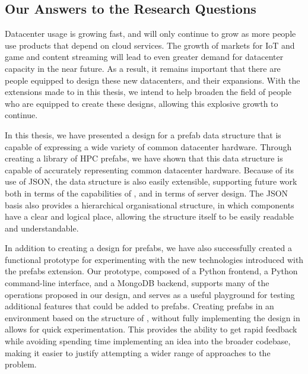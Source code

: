 \documentclass[11pt]{article}
\begin{document}
	\subsection{Our Answers to the Research Questions}
		Datacenter usage is growing fast, and will only continue to grow as more people use products that depend on cloud services.
		The growth of markets for IoT and game and content streaming will lead to even greater demand for datacenter capacity in the near future.
		As a result, it remains important that there are people equipped to design these new datacenters, and their expansions.
		With the extensions made to \opendc{} in this thesis, we intend to help broaden the field of people who are equipped to create these designs, allowing this explosive growth to continue.

		In this thesis, we have presented a design for a prefab data structure that is capable of expressing a wide variety of common datacenter hardware.
		Through creating a library of HPC prefabs, we have shown that this data structure is capable of accurately representing common datacenter hardware.
		Because of its use of JSON, the data structure is also easily extensible, supporting future work both in terms of the capabilities of \opendc{}, and in terms of server design.
		The JSON basis also provides a hierarchical organisational structure, in which components have a clear and logical place, allowing the structure itself to be easily readable and understandable.
		
		In addition to creating a design for prefabs, we have also successfully created a functional prototype for experimenting with the new technologies introduced with the prefabs extension.
		Our prototype, composed of a Python frontend, a Python command-line interface, and a MongoDB backend, supports many of the operations proposed in our design, and serves as a useful playground for testing additional features that could be added to prefabs.
		Creating prefabs in an environment based on the structure of \opendc{}, without fully implementing the design in \opendc{} allows for quick experimentation.
		This provides the ability to get rapid feedback while avoiding spending time implementing an idea into the broader \opendc{} codebase, making it easier to justify attempting a wider range of approaches to the problem.
\end{document}
